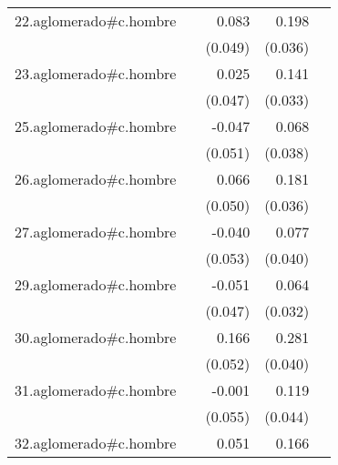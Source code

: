 {\begin{longtable}{l*{4}{D{.}{.}{-1}}}
\addlinespace
22.aglomerado#c.hombre&                     &       0.083         &       0.198\sym{***}&                     \\
            &                     &     (0.049)         &     (0.036)         &                     \\
\addlinespace
23.aglomerado#c.hombre&                     &       0.025         &       0.141\sym{***}&                     \\
            &                     &     (0.047)         &     (0.033)         &                     \\
\addlinespace
25.aglomerado#c.hombre&                     &      -0.047         &       0.068         &                     \\
            &                     &     (0.051)         &     (0.038)         &                     \\
\addlinespace
26.aglomerado#c.hombre&                     &       0.066         &       0.181\sym{***}&                     \\
            &                     &     (0.050)         &     (0.036)         &                     \\
\addlinespace
27.aglomerado#c.hombre&                     &      -0.040         &       0.077         &                     \\
            &                     &     (0.053)         &     (0.040)         &                     \\
\addlinespace
29.aglomerado#c.hombre&                     &      -0.051         &       0.064\sym{*}  &                     \\
            &                     &     (0.047)         &     (0.032)         &                     \\
\addlinespace
30.aglomerado#c.hombre&                     &       0.166\sym{**} &       0.281\sym{***}&                     \\
            &                     &     (0.052)         &     (0.040)         &                     \\
\addlinespace
31.aglomerado#c.hombre&                     &      -0.001         &       0.119\sym{**} &                     \\
            &                     &     (0.055)         &     (0.044)         &                     \\
\addlinespace
32.aglomerado#c.hombre&                     &       0.051         &       0.166\sym{***}&                     \\

\end{longtable}}
